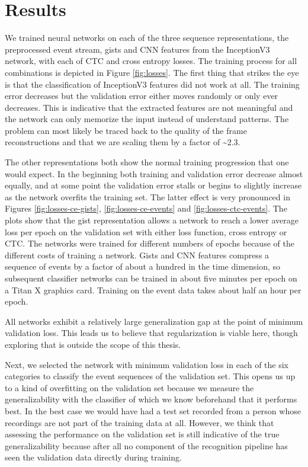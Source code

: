 \chapter{Results}
\label{cha:results}

We trained neural networks on each of the three sequence representations, the
preprocessed event stream, gists and CNN features from the InceptionV3 network,
with each of CTC and cross entropy losses. The training process for all
combinations is depicted in Figure \ref{fig:losses}. The first thing that
strikes the eye is that the classification of InceptionV3 features did not work
at all. The training error decreases but the validation error either moves
randomly or only ever decreases. This is indicative that the extracted features
are not meaningful and the network can only memorize the input instead of
understand patterns. The problem can most likely be traced back to the quality
of the frame reconstructions and that we are scaling them by a factor of
\textasciitilde 2.3.

The other representations both show the normal training progression that one
would expect. In the beginning both training and validation error decrease
almost equally, and at some point the validation error stalls or begins to
slightly increase as the network overfits the training set. The latter effect is
very pronounced in Figures \ref{fig:losses-ce-gists}, \ref{fig:losses-ce-events}
and \ref{fig:losses-ctc-events}. The plots show that the gist representation
allows a network to reach a lower average loss per epoch on the validation set
with either loss function, cross entropy or CTC. The networks were trained for
different numbers of epochs because of the different costs of training a
network. Gists and CNN features compress a sequence of events by a factor of
about a hundred in the time dimension, so subsequent classifier networks can be
trained in about five minutes per epoch on a Titan X graphics card. Training on
the event data takes about half an hour per epoch.

All networks exhibit a relatively large generalization gap at the point of
minimum validation loss. This leads us to believe that regularization is viable
here, though exploring that is outside the scope of this thesis.

Next, we selected the network with minimum validation loss in each of the six
categories to classify the event sequences of the validation set. This opens us
up to a kind of overfitting on the validation set because we measure the
generalizability with the classifier of which we know beforehand that it
performs best. In the best case we would have had a test set recorded from a
person whose recordings are not part of the training data at all. However, we
think that assessing the performance on the validation set is still indicative
of the true generalizability because after all no component of the recognition
pipeline has seen the validation data directly during training.

